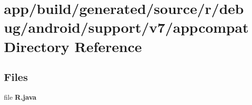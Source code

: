 \section{app/build/generated/source/r/debug/android/support/v7/appcompat Directory Reference}
\label{dir_2f024b70d4ab7ff3a7c82919671a0d30}
\subsection*{Files}
\begin{DoxyCompactItemize}
\item 
file {\bfseries R.\+java}
\end{DoxyCompactItemize}
